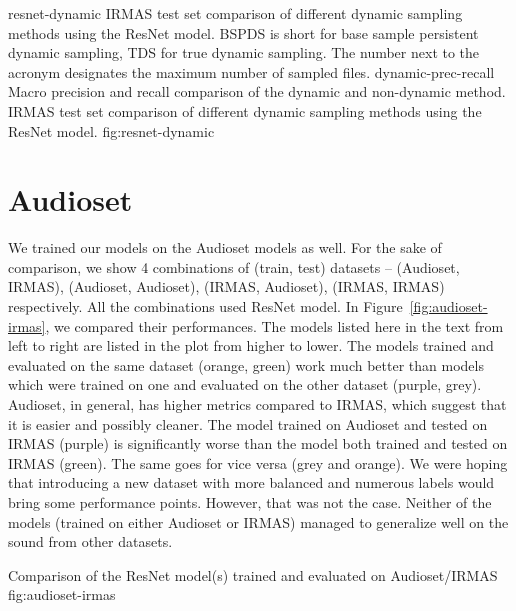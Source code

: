 
\asideimages{14cm}{14cm}
	    {resnet-dynamic}
	    {IRMAS test set comparison of different dynamic sampling methods using the ResNet model. BSPDS is short for base sample persistent dynamic sampling, TDS for true dynamic sampling. The number next to the acronym designates the maximum number of sampled files.}
	    {dynamic-prec-recall}
	    {Macro precision and recall comparison of the dynamic and non-dynamic method.}
	    {IRMAS test set comparison of different dynamic sampling methods using the ResNet model.}
	    {fig:resnet-dynamic}

\section{Audioset}
\label{sec:eval:audioset}
We trained our models on the Audioset models as well. For the sake of comparison, we show 4 combinations of (train, test) datasets -- (Audioset, IRMAS), (Audioset, Audioset), (IRMAS, Audioset), (IRMAS, IRMAS) respectively. All the combinations used ResNet model. In Figure~\ref{fig:audioset-irmas}, we compared their performances. The models listed here in the text from left to right are listed in the plot from higher to lower. The models trained and evaluated on the same dataset (orange, green) work much better than models which were trained on one and evaluated on the other dataset (purple, grey). Audioset, in general, has higher metrics compared to IRMAS, which suggest that it is easier and possibly cleaner. The model trained on Audioset and tested on IRMAS (purple) is significantly worse than the model both trained and tested on IRMAS (green). The same goes for vice versa (grey and orange). We were hoping that introducing a new dataset with more balanced and numerous labels would bring some performance points. However, that was not the case. Neither of the models (trained on either Audioset or IRMAS) managed to generalize well on the sound from other datasets. 

	        {Comparison of the ResNet model(s) trained and evaluated on Audioset/IRMAS}
                {fig:audioset-irmas}


